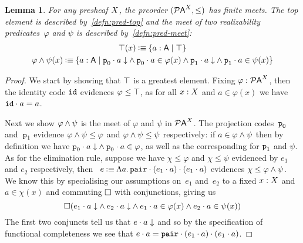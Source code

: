 \documentclass[11pt]{article}
\newtheorem{lemm}[thrm]{Lemma}
\begin{document}

\begin{lemm}
  For any presheaf \(X\), the preorder \(({\mathcal{P}{\mathsf{A}}}^{X}, \leq)\) has finite
  meets.
  The top element is described by~\ref{defn:pred-top} and the meet of two
  realizability predicates~\(\varphi\) and \(\psi\) is described
  by~\ref{defn:pred-meet}:
  \begin{gather}
    \TTop{\X}(x)
    \IsDefined
    \ISetComp{a:\A}{\ITop}
    \label{defn:pred-top}
    \\
    \TAnd{\varphi}{\psi}{\X}(x)
    \IsDefined
    \ISetComp{a:\A}{\IAnd%
      {\IAnd{\ITotal{\IAp{\IFstCode}{a}}}{\IAp{\IFstCode}{a}\in\varphi(x)}}%
      {\IAnd{\ITotal{\IAp{\ISndCode}{a}}}{\IAp{\ISndCode}{a}\in\psi(x)}}
    }
    \label{defn:pred-meet}
  \end{gather}
\end{lemm}
\begin{proof}
  We start by showing that \(\top\) is a greatest element.
  Fixing \(\varphi:{\mathcal{P}{\mathsf{A}}}^{X}\), then the identity code \(\texttt{id}\)
  evidences \(\varphi \leq \top\), as for all \(x : X\) and
  \(a \in \varphi(x)\) we have \({\texttt{id}}\cdot{a} = a\).

  Next we show \({\varphi}\land{\psi}\) is the meet of \(\varphi\) and
  \(\psi\) in \({\mathcal{P}{\mathsf{A}}}^{X}\).
  The projection codes~\(\texttt{p}_0\) and~\(\texttt{p}_1\) evidence
  \({\varphi}\land{\psi}\leq\varphi\) and
  \({\varphi}\land{\psi}\leq\psi\) respectively:
  if \(a \in {\varphi}\land{\psi}\) then by definition we have
  \({{{\texttt{p}_0}\cdot{a}}\downarrow}\land{{\texttt{p}_0}\cdot{a}\in\varphi}\), as
  well as the corresponding for \(\texttt{p}_1\) and \(\psi\).
  As for the elimination rule, suppose we have \(\chi\leq\varphi\) and
  \(\chi\leq\psi\) evidenced by \(e_{1}\) and \(e_{2}\) respectively,
  then~%
  \(
    e \mathbin{\vcentcolon\equiv}
    \Lambda{a}.\,{{{\texttt{pair}}\cdot{({e_{1}}\cdot{a})}}\cdot{({e_{1}}\cdot{a})}}
  \)
  evidences \(\chi\leq{\varphi}\land{\psi}\).
  We know this by specialising our assumptions on~\(e_{1}\) and~\(e_{2}\)
  to a fixed \(x:X\) and \(a\in\chi(x)\) and commuting \(\Box\) with
  conjunctions, giving us
  \[
    \Box{
      ({
        {{{e_{1}}\cdot{a}}\downarrow}\land{{{e_{2}}\cdot{a}}\downarrow}
      }\land{
        {{e_{1}}\cdot{a}\in\varphi(x)}\land{{e_{2}}\cdot{a}\in\psi(x)}
      })
    }
  \]
  The first two conjuncts tell us that \({{e}\cdot{a}}\downarrow\) and so by the
  specification of functional completeness we see that
  \({e}\cdot{a} = {{\texttt{pair}}\cdot{({e_{1}}\cdot{a})}}\cdot{({e_{1}}\cdot{a})}\).
\end{proof}
\end{document}
